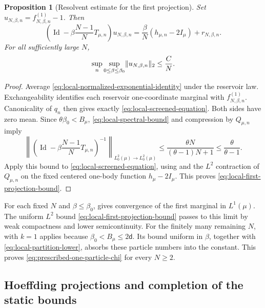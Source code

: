 \documentclass[11pt,reqno]{amsart}
\numberwithin{equation}{section}
\theoremstyle{plain}
\newtheorem{prop}[prop]{Proposition}
\theoremstyle{definition}
\DeclarePairedDelimiter{\norm}{\lVert}{\rVert}
\renewcommand{\d}{\mathsf d}
\newcommand{\Id}{\operatorname{Id}}
\newcommand{\be}{\beta}
\begin{document}
\begin{prop}[Resolvent estimate for the first projection]
\label{prop:local-screened-first-projection}
Set $u_{N,\be,n}=f_{N,\be,n}^{(1)}-1$. Then
\begin{equation}
 \left(\Id-\be\frac{N-1}{N}T_{\mu,n}\right)u_{N,\be,n}
 =\frac{\be}{N}(h_{\mu,n}-2I_\mu)+r_{N,\be,n}.
 \label{eq:local-screened-equation}
\end{equation}
For all sufficiently large $N$,
\begin{equation}
 \sup_n\sup_{0\leq\be\leq\be_0}\norm{u_{N,\be,n}}_2\leq\frac{C}{N}.
 \label{eq:local-first-projection-bound}
\end{equation}
\end{prop}
\begin{proof}
Average \eqref{eq:local-normalized-exponential-identity} under the reservoir law. Exchangeability identifies each reservoir one-coordinate marginal with $f_{N,\be,n}^{(1)}$. Canonicality of $q_n$ then gives exactly \eqref{eq:local-screened-equation}. Both sides have zero mean. Since $\theta\be_0<B_\mu$, \eqref{eq:local-spectral-bound} and compression by $Q_{\mu,n}$ imply
\begin{equation}
 \left\|\left(\Id-\be\frac{N-1}{N}T_{\mu,n}\right)^{-1}\right\|_{L^2_0(\mu)\to L^2_0(\mu)}
 \leq\frac{\theta N}{(\theta-1)N+1}\leq\frac{\theta}{\theta-1}.
 \label{eq:local-screened-resolvent-bound}
\end{equation}
Apply this bound to \eqref{eq:local-screened-equation}, using  and the $L^2$ contraction of $Q_{\mu,n}$ on the fixed centered one-body function $h_\mu-2I_\mu$. This proves \eqref{eq:local-first-projection-bound}.
\end{proof}

For each fixed $N$ and $\be\leq\be_0$,  gives convergence of the first marginal in $L^1(\mu)$. The uniform $L^2$ bound \eqref{eq:local-first-projection-bound} passes to this limit by weak compactness and lower semicontinuity. For the finitely many remaining $N$,  with $k=1$ applies because $\be_0<B_\mu\leq2\d$. Its bound uniform in $\be$, together with \eqref{eq:local-partition-lower}, absorbs these particle numbers into the constant. This proves \eqref{eq:prescribed-one-particle-chi} for every $N\geq2$.

\subsection{Hoeffding projections and completion of the static bounds}
\label{subsec:local-Hoeffding-entropy}
\end{document}
